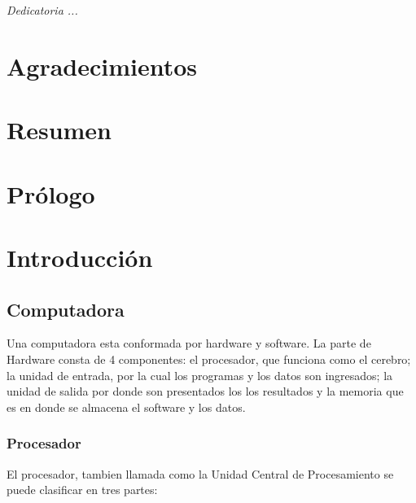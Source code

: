 \documentclass[letterpaper,12pt,oneside]{book}
\author{Luis Esteban Serrano Bermúdez}
\title{}
\begin{document}
	\frontmatter
	\maketitle
	\chapter*{}

	\begin{flushright}%
	  \emph{Dedicatoria ...}
	  \thispagestyle{empty}
	\end{flushright}

	\chapter{Agradecimientos}

	\chapter{Resumen}

	\tableofcontents
	\listoffigures

	\chapter{Prólogo}
	    
	\mainmatter

	\chapter{Introducción}
		
		\section{Computadora}
			Una computadora esta conformada por hardware y software. La parte de Hardware consta de 4 componentes: el procesador, que funciona como el cerebro; la unidad de entrada, por la cual los programas y los datos son ingresados; la unidad de salida por donde son presentados los los resultados y la memoria que es en donde se almacena el software y los datos.

			\subsection{Procesador}
				El procesador, tambien llamada como la Unidad Central de Procesamiento se puede clasificar en tres partes:
				
\end{document}
